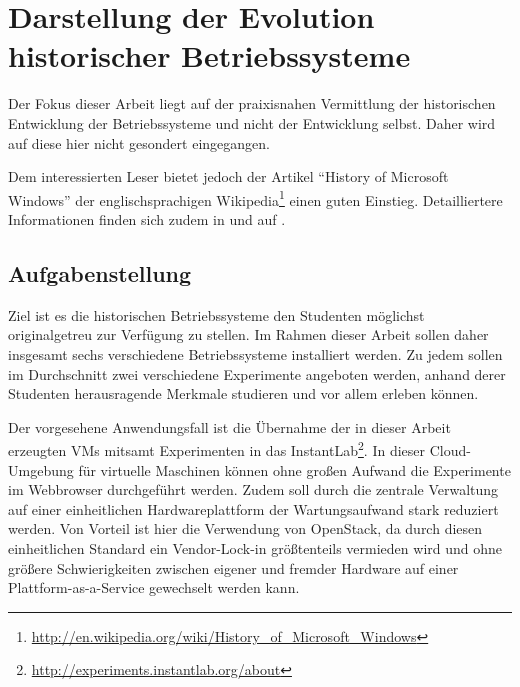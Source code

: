 \chapter{Darstellung der Evolution historischer Betriebssysteme}
\label{chap:challenges}

Der Fokus dieser Arbeit liegt auf der praixisnahen Vermittlung der historischen Entwicklung der Betriebssysteme und nicht der Entwicklung selbst. Daher wird auf diese hier nicht gesondert eingegangen.

Dem interessierten Leser bietet jedoch der Artikel "`History of Microsoft Windows"' der englischsprachigen Wikipedia\footnote{\url{http://en.wikipedia.org/wiki/History_of_Microsoft_Windows}} einen guten Einstieg.
Detailliertere Informationen finden sich zudem in \cite{WinInt1} und auf \cite{WinHistory}.

\section{Aufgabenstellung}
\label{sec:aims}


		Ziel ist es die historischen Betriebssysteme den Studenten möglichst originalgetreu zur Verfügung zu stellen. 
		Im Rahmen dieser Arbeit sollen daher insgesamt sechs verschiedene Betriebssysteme installiert werden. 
		Zu jedem sollen im Durchschnitt zwei verschiedene Experimente angeboten werden, anhand derer Studenten herausragende Merkmale studieren und vor allem erleben können.

		Der vorgesehene Anwendungsfall ist die Übernahme der in dieser Arbeit erzeugten VMs mitsamt Experimenten in das InstantLab\footnote{\url{http://experiments.instantlab.org/about}}. 
		In dieser Cloud-Umgebung für virtuelle Maschinen können ohne großen Aufwand die Experimente im Webbrowser durchgeführt werden. 
		Zudem soll durch die zentrale Verwaltung auf einer einheitlichen Hardwareplattform der Wartungsaufwand stark reduziert werden.
		Von Vorteil ist hier die Verwendung von OpenStack, da durch diesen einheitlichen Standard ein Vendor-Lock-in größtenteils vermieden wird und ohne größere Schwierigkeiten zwischen eigener und fremder Hardware auf einer Plattform-as-a-Service gewechselt werden kann.


